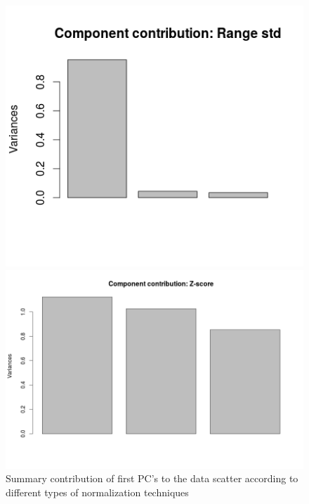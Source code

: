 \begin{figure}[h]
	\centering
	\hspace{-1cm}
	\begin{minipage}[h]{0.49\linewidth}
\includegraphics[width=\linewidth]{images/singular_values_rangenrm}
	\end{minipage}
	\hfill
	\begin{minipage}[h]{0.49\linewidth}
\includegraphics[width=\linewidth]{images/singular_values_zscore}
	\end{minipage}
	\vspace{-1cm}
	\caption{Summary contribution of first PC's to the data scatter according to different types of normalization techniques}
	\label{fig:data_scatter_contibution}
\end{figure} 


